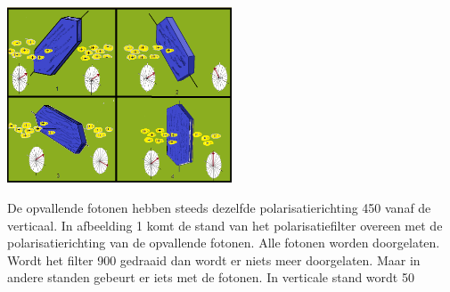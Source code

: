 \documentclass[../main.tex]{subfiles}
\begin{document}
\begin{center}
\leavevmode
\includegraphics[width=0.5\textwidth]{./img/vierstanden.png}
\end{center}

De opvallende fotonen hebben steeds dezelfde polarisatierichting 450 vanaf de verticaal. In afbeelding 1 komt de stand van het polarisatiefilter overeen met de polarisatierichting van de opvallende fotonen. Alle fotonen worden doorgelaten. Wordt het filter 900 gedraaid dan wordt er niets meer doorgelaten. Maar in andere standen gebeurt er iets met de fotonen. In verticale stand wordt 50%
\end{document}
